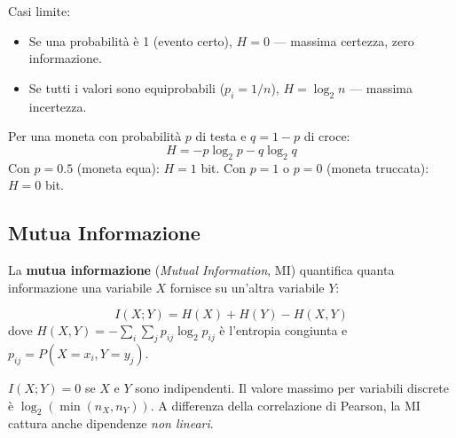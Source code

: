 Casi limite:
\begin{itemize}
  \item Se una probabilità è 1 (evento certo), $H = 0$ — massima certezza, zero informazione.
  \item Se tutti i valori sono equiprobabili ($p_i = 1/n$), $H = \log_2 n$ — massima incertezza.
\end{itemize}

\begin{example}
Per una moneta con probabilità $p$ di testa e $q = 1-p$ di croce:
\[
  H = -p \log_2 p - q \log_2 q
\]
Con $p=0.5$ (moneta equa): $H = 1$ bit. Con $p=1$ o $p=0$ (moneta truccata): $H = 0$ bit.
\end{example}

\subsection{Mutua Informazione}

La \textbf{mutua informazione} (\textit{Mutual Information}, MI) quantifica quanta informazione una variabile $X$ fornisce su un'altra variabile $Y$:

\begin{definition}
\begin{equation}
  I(X; Y) = H(X) + H(Y) - H(X, Y)
  \label{eq:mutual-info}
\end{equation}
dove $H(X,Y) = -\sum_i \sum_j p_{ij} \log_2 p_{ij}$ è l'entropia congiunta e $p_{ij} = P(X = x_i, Y = y_j)$.
\end{definition}

$I(X;Y) = 0$ se $X$ e $Y$ sono indipendenti. Il valore massimo per variabili discrete è $\log_2(\min(n_X, n_Y))$. A differenza della correlazione di Pearson, la MI cattura anche dipendenze \textit{non lineari}.


